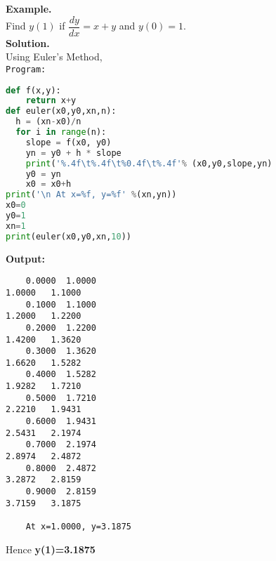 \documentclass[12pt,a4paper,oneside]{book}
\begin{document}
\noindent\textbf{Example.}\\
Find $y(1)$ if $\dfrac{dy}{dx}=x+y$ and $y(0)=1$.\\[0.3cm]
\textbf{Solution.}\\
Using Euler's Method,\\
\texttt{Program:}
\begin{lstlisting}[language=Python]
def f(x,y):
	return x+y
def euler(x0,y0,xn,n):
  h = (xn-x0)/n
  for i in range(n):
	slope = f(x0, y0)
	yn = y0 + h * slope
  	print('%.4f\t%.4f\t%0.4f\t%.4f'% (x0,y0,slope,yn)
  	y0 = yn
  	x0 = x0+h
print('\n At x=%f, y=%f' %(xn,yn))
x0=0
y0=1
xn=1
print(euler(x0,y0,xn,10))
\end{lstlisting}
\textbf{Output:}
\begin{verbatim}
	0.0000  1.0000                                                                          1.0000   1.1000
	0.1000  1.1000                                                                          1.2000   1.2200
	0.2000  1.2200                                                                          1.4200   1.3620
	0.3000  1.3620                                                                          1.6620   1.5282
	0.4000  1.5282                                                                          1.9282   1.7210
	0.5000  1.7210                                                                          2.2210   1.9431
	0.6000  1.9431                                                                          2.5431   2.1974
	0.7000  2.1974                                                                          2.8974   2.4872
	0.8000  2.4872                                                                          3.2872   2.8159
	0.9000  2.8159                                                                          3.7159   3.1875
	
	At x=1.0000, y=3.1875
\end{verbatim}
Hence \textbf{y(1)=3.1875}
\end{document}
